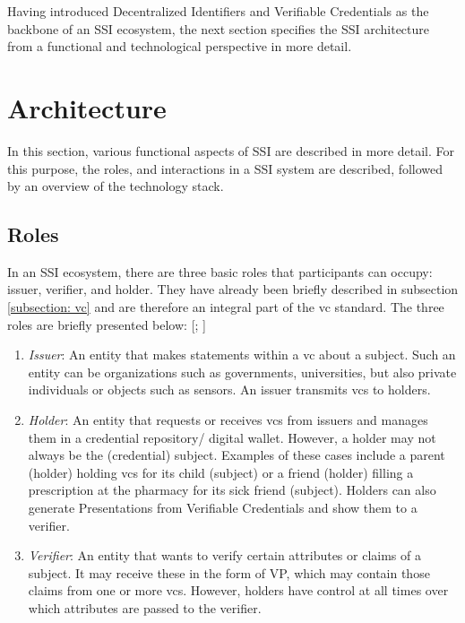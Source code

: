         Having introduced Decentralized Identifiers and Verifiable Credentials as the backbone of an \ac{SSI} ecosystem, the next section specifies the \ac{SSI} architecture from a functional and technological perspective in more detail.
	   
    \section{Architecture}
        In this section, various functional aspects of \ac{SSI} are described in more detail. For this purpose, the roles, and interactions in a \ac{SSI} system are described, followed by an overview of the technology stack.
        
    	\subsection{Roles}\label{subsection: vc roles}
    	
    	In an \ac{SSI} ecosystem, there are three basic roles that participants can occupy: issuer, verifier, and holder. They have already been briefly described in subsection \ref{subsection: vc} and are therefore an integral part of the \ac{vc} standard. The three roles are briefly presented below: [\citealp[pp. 25-26]{preukschat_self-sovereign_2021}; \citealp{sporny_verifiable_2019}]
    	
    	\begin{enumerate}
        	\item \textit{Issuer}: An entity that makes statements within a \ac{vc} about a subject. Such an entity can be organizations such as governments, universities, but also private individuals or objects such as sensors. An issuer transmits \acp{vc} to holders.
        	\item \textit{Holder}: An entity that requests or receives \acp{vc} from issuers and manages them in a credential repository/ digital wallet. However, a holder may not always be the (credential) subject. Examples of these cases include a parent (holder) holding \acp{vc} for its child (subject) or a friend (holder) filling a prescription at the pharmacy for its sick friend (subject). Holders can also generate Presentations from Verifiable Credentials and show them to a verifier.  
        	\item \textit{Verifier}: An entity that wants to verify certain attributes or claims of a subject. It may receive these in the form of \ac{VP}, which may contain those claims from one or more \acp{vc}. However, holders have control at all times over which attributes are passed to the verifier.
        \end{enumerate}
        
